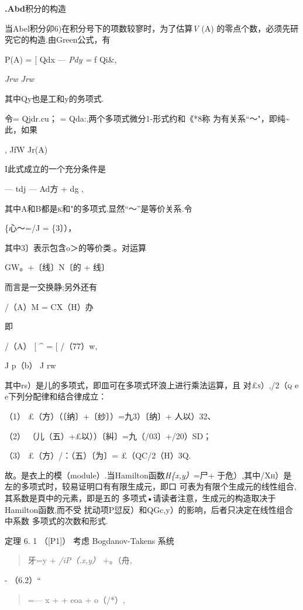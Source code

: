 \documentclass{article}
\begin{document}
\textbf{.Abd}积分的构造

当Abel积分卯6)在积分号下的项数较寥时，为了估算\emph{V} (A)
的零点个数，必须先研究它的构造.由Green公式，有

P(A) = {[} Qdx --- \emph{Pdy =} f Qi\&,

\emph{Jrw Jrw}

其中Qy也是工和y的务项式.

令= Qjdr.cu； = Qda:,两个多项式微分1-形式约和《*8称
为有关系``〜"，即纯\textasciitilde{}此，如果

, JfW Jr(A)

I此式成立的一个充分条件是

--- tdj --- Ad方 + dg ,

其中A和B都是\textsc{k}和"的多项式.显然``〜''是等价关系.令

\{心〜=/J = \{3〕），

其中3〕表示包含o＞的等价类.。对运算

GW。+〔线〕N〔的 + 线〕

而言是一交换静;另外还有

/（A）M = CX（H）办

即

/（A） {[} \^{} = {[} /（77）w,

J p（b） J rw

其中rs）是儿的多项式，即皿可在多项式环浪上进行乘法运算，且
对\textsc{£s）,/2（q} e e下列分配律和结合律成立：

（1） £（方）（〔纳〕+〔纱〕）=九3）〔纳〕+ 人以）32、

（2） （儿（五）+£以））〔糾〕=九（/03\textbar{}〕+/20）SD；

（3） £（方）/：（五）〔为〕= £（QC/2（H）3Q.

故。是衣上的模（module）.当Hamilton函数\emph{H\{x,y）}=尸+
于危）,其中/\textsc{Xh）}是左的多项式时，较易证明口有有限生成元，即口
可表为有限个生成元的线性组合,其系数是頁中的元素，即是五的
多项式•请读者注意，生成元的构造取决于Hamilton函数,而不受
扰动项P愆反）和QGc,y）的影响，后者只决定在线性组合中系数
多项式的次数和形式.

定理 6. 1 （{[}P1{]}） 考虑 Bogdanov-Takens 系统

\begin{quote}
牙=y + \emph{/iP（.x,y）} +。（舟,
\end{quote}

- （6.2）``

\begin{quote}
=--- x + + eoa + o（/*）,
\end{quote}
\end{document}
